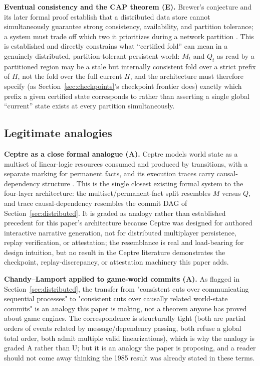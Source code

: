 \documentclass[11pt]{article}
\begin{document}
\textbf{Eventual consistency and the CAP theorem (E).} Brewer's conjecture and its later formal proof establish that a distributed data store cannot simultaneously guarantee strong consistency, availability, and partition tolerance; a system must trade off which two it prioritizes during a network partition \cite{gilbertlynch2002}. This is established and directly constrains what ``certified fold'' can mean in a genuinely distributed, partition-tolerant persistent world: $M_t$ and $Q_t$ as read by a partitioned region may be a stale but internally consistent fold over a strict prefix of $H$, not the fold over the full current $H$, and the architecture must therefore specify (as Section~\ref{sec:checkpoints}'s checkpoint frontier does) exactly which prefix a given certified state corresponds to rather than asserting a single global ``current'' state exists at every partition simultaneously.

\subsection{Legitimate analogies}
\label{sec:analogies}

\textbf{Ceptre as a close formal analogue (A).} Ceptre models world state as a multiset of linear-logic resources consumed and produced by transitions, with a separate marking for permanent facts, and its execution traces carry causal-dependency structure \cite{martens2015}. This is the single closest existing formal system to the four-layer architecture: the multiset/permanent-fact split resembles $M$ versus $Q$, and trace causal-dependency resembles the commit DAG of Section~\ref{sec:distributed}. It is graded as analogy rather than established precedent for this paper's architecture because Ceptre was designed for authored interactive narrative generation, not for distributed multiplayer persistence, replay verification, or attestation; the resemblance is real and load-bearing for design intuition, but no result in the Ceptre literature demonstrates the checkpoint, replay-discrepancy, or attestation machinery this paper adds.

\textbf{Chandy--Lamport applied to game-world commits (A).} As flagged in Section~\ref{sec:distributed}, the transfer from "consistent cuts over communicating sequential processes" to "consistent cuts over causally related world-state commits" is an analogy this paper is making, not a theorem anyone has proved about game engines. The correspondence is structurally tight (both are partial orders of events related by message/dependency passing, both refuse a global total order, both admit multiple valid linearizations), which is why the analogy is graded A rather than U; but it is an analogy the paper is proposing, and a reader should not come away thinking the 1985 result was already stated in these terms.
\end{document}
